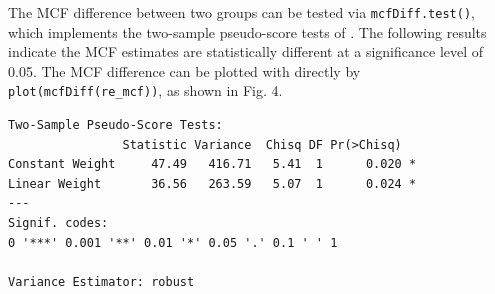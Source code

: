 The MCF difference between two groups can be tested via
\texttt{mcfDiff.test()}, which implements the two-sample pseudo-score
tests of \citep{cook1996biometrics}. The following results indicate the
MCF estimates are statistically different at a significance level of
0.05. The MCF difference can be plotted with directly by
\texttt{plot(mcfDiff(re\_mcf))}, as shown in Fig. 4.

\begin{Shaded}
\begin{Highlighting}[]
\end{Highlighting}
\end{Shaded}

\begin{verbatim}
Two-Sample Pseudo-Score Tests:
                Statistic Variance  Chisq DF Pr(>Chisq)  
Constant Weight     47.49   416.71   5.41  1      0.020 *
Linear Weight       36.56   263.59   5.07  1      0.024 *
---
Signif. codes:  
0 '***' 0.001 '**' 0.01 '*' 0.05 '.' 0.1 ' ' 1

Variance Estimator: robust 
\end{verbatim}

